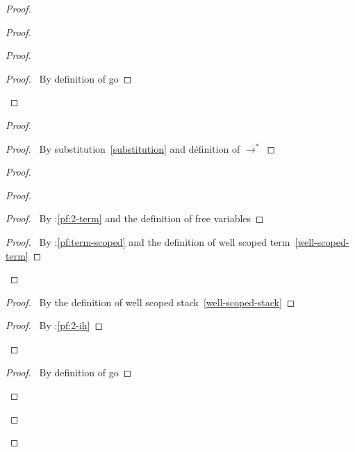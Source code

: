 \documentclass[a4paper]{article}
\begin{document}
\begin{proof}
\begin{proof}
\begin{proof}
      \begin{proof}
        \pf\ By definition of \textsf{go}
      \end{proof}
    \end{proof}
    \begin{proof}
      \begin{proof}
        \pf\ By substitution~\ref{substitution} and définition of $\to^*$
      \end{proof}
      \begin{proof}
        \begin{proof}
          \begin{proof}
            \pf\ By :\ref{pf:2-term} and the definition of free variables
          \end{proof}
          \qedstep
          \begin{proof}
            \pf\ By \toplevel:\ref{pf:term-scoped} and the definition of well scoped term~\ref{well-scoped-term}
          \end{proof}
        \end{proof}
        \begin{proof}
          \pf\ By the definition of well scoped stack~\ref{well-scoped-stack}
        \end{proof}
        \qedstep
        \begin{proof}
          \pf\ By :\ref{pf:2-ih}
        \end{proof}
      \end{proof}
      \begin{proof}
        \pf\ By definition of \textsf{go}

\end{proof}
\end{proof}
\end{proof}
\end{proof}
\end{document}

